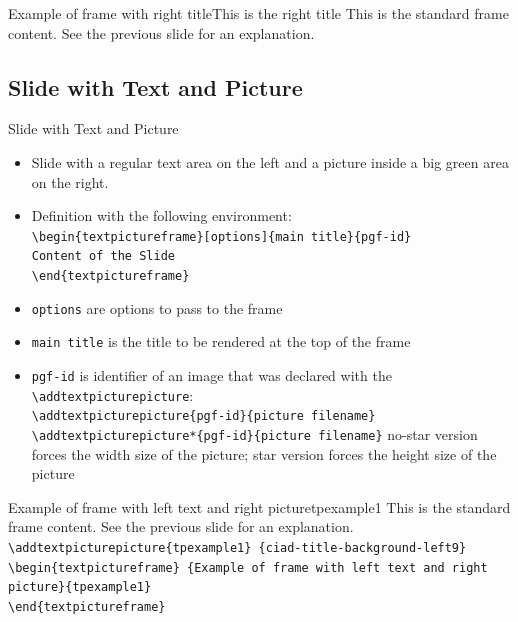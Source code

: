 \documentclass[english,sectioncirclenumberstyle]{ciadbeamer}
\begin{document}
\begin{righttitleframe}{Example of frame with right title}{This is the right title}
	This is the standard frame content. See the previous slide for an explanation.
\end{righttitleframe}

\subsection{Slide with Text and Picture}

\begin{frame}{Slide with Text and Picture}
	\begin{itemize}
		\item Slide with a regular text area on the left and a picture inside a big green area on the right.
		\item Definition with the following environment: \\
		\texttt{{\textbackslash}begin\{textpictureframe\}[options]\{main title\}\{pgf-id\}} \\
		\texttt{Content of the Slide} \\
		\texttt{{\textbackslash}end\{textpictureframe\}}
		\item \texttt{options} are options to pass to the frame
		\item \texttt{main title} is the title to be rendered at the top of the frame
		\item \texttt{pgf-id} is identifier of an image that was declared with the \texttt{{\textbackslash}addtextpicturepicture}: \\
		\texttt{{\textbackslash}addtextpicturepicture\{pgf-id\}\{picture filename\}} \\
		\texttt{{\textbackslash}addtextpicturepicture*\{pgf-id\}\{picture filename\}}
		no-star version forces the width size of the picture; star version forces the height size of the picture
	\end{itemize}
\end{frame}

\begin{textpictureframe}{{Example of frame} with left text and right picture}{tpexample1}
	This is the standard frame content. See the previous slide for an explanation. \\[.5cm]
	\smaller
	\texttt{{\textbackslash}addtextpicturepicture\{tpexample1\} \{ciad-title-background-left9\}} \\
	\texttt{{\textbackslash}begin\{textpictureframe\} \{Example of frame with left text and right picture\}\{tpexample1\}} \\
	\texttt{{\textbackslash}end\{textpictureframe\}}
\end{textpictureframe}
\end{document}

